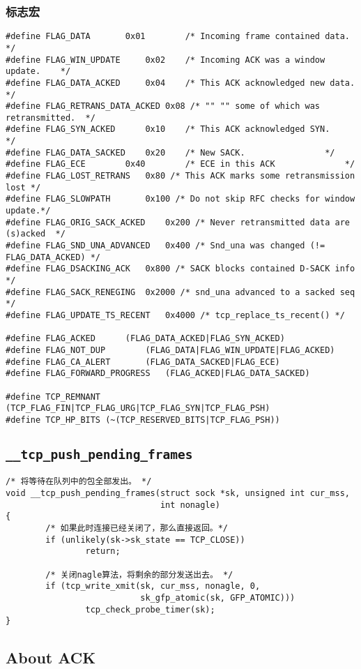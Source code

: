 		\subsubsection{标志宏}
\begin{verbatim}
#define FLAG_DATA		0x01 		/* Incoming frame contained data.		*/
#define FLAG_WIN_UPDATE		0x02 	/* Incoming ACK was a window update.	*/
#define FLAG_DATA_ACKED		0x04 	/* This ACK acknowledged new data.		*/
#define FLAG_RETRANS_DATA_ACKED	0x08 /* "" "" some of which was retransmitted.	*/
#define FLAG_SYN_ACKED		0x10 	/* This ACK acknowledged SYN.		*/
#define FLAG_DATA_SACKED	0x20 	/* New SACK.				*/
#define FLAG_ECE		0x40 		/* ECE in this ACK				*/
#define FLAG_LOST_RETRANS	0x80 /* This ACK marks some retransmission lost */
#define FLAG_SLOWPATH		0x100 /* Do not skip RFC checks for window update.*/
#define FLAG_ORIG_SACK_ACKED	0x200 /* Never retransmitted data are (s)acked	*/
#define FLAG_SND_UNA_ADVANCED	0x400 /* Snd_una was changed (!= FLAG_DATA_ACKED) */
#define FLAG_DSACKING_ACK	0x800 /* SACK blocks contained D-SACK info */
#define FLAG_SACK_RENEGING	0x2000 /* snd_una advanced to a sacked seq */
#define FLAG_UPDATE_TS_RECENT	0x4000 /* tcp_replace_ts_recent() */

#define FLAG_ACKED		(FLAG_DATA_ACKED|FLAG_SYN_ACKED)
#define FLAG_NOT_DUP		(FLAG_DATA|FLAG_WIN_UPDATE|FLAG_ACKED)
#define FLAG_CA_ALERT		(FLAG_DATA_SACKED|FLAG_ECE)
#define FLAG_FORWARD_PROGRESS	(FLAG_ACKED|FLAG_DATA_SACKED)

#define TCP_REMNANT (TCP_FLAG_FIN|TCP_FLAG_URG|TCP_FLAG_SYN|TCP_FLAG_PSH)
#define TCP_HP_BITS (~(TCP_RESERVED_BITS|TCP_FLAG_PSH))
\end{verbatim}
	\subsection{\texttt{__tcp_push_pending_frames}}
\begin{verbatim}
/* 将等待在队列中的包全部发出。 */
void __tcp_push_pending_frames(struct sock *sk, unsigned int cur_mss,
                               int nonagle)
{
        /* 如果此时连接已经关闭了，那么直接返回。*/
        if (unlikely(sk->sk_state == TCP_CLOSE))
                return;

        /* 关闭nagle算法，将剩余的部分发送出去。 */
        if (tcp_write_xmit(sk, cur_mss, nonagle, 0,
                           sk_gfp_atomic(sk, GFP_ATOMIC)))
                tcp_check_probe_timer(sk);
}
\end{verbatim}
	\subsection{About ACK}	
